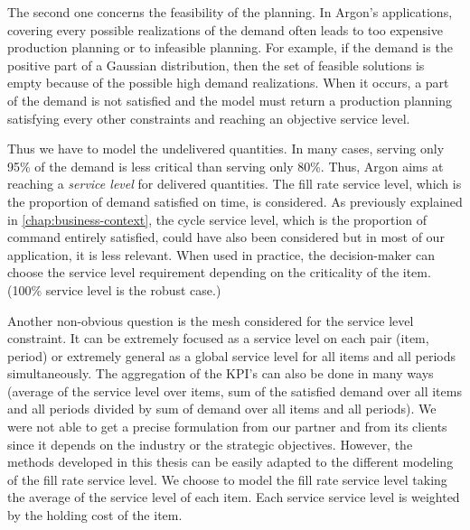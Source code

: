 The second one concerns the feasibility of the planning.
In Argon's applications, covering every possible realizations of the demand often leads to too expensive production planning or to infeasible planning.
For example, if the demand is the positive part of a Gaussian distribution, then the set of feasible solutions is empty  because of the possible high demand realizations.
When it occurs, a part of the demand is not satisfied and the model must return a production planning satisfying every other constraints and reaching an objective service level.


Thus we have to model the undelivered quantities.
In many cases, serving only 95\% of the demand is less critical than serving only 80\%.
Thus, Argon aims at reaching a \emph{service level} for delivered quantities.
The fill rate service level, which is the proportion of demand satisfied on time, is considered.
As previously explained in \cref{chap:business-context}, the cycle service level, which is the proportion of command entirely satisfied, could have also been considered but in most of our application, it is less relevant.
When used in practice, the decision-maker can choose the service level requirement depending on the criticality of the item.
(100\% service level is the robust case.)


Another non-obvious question is the mesh considered for the service level constraint.
It can be extremely focused as a service level on each pair (item, period) or extremely general as a global service level for all items and all periods simultaneously.
The aggregation of the KPI's can also be done in many ways (\eg average of the service level over items, sum of the satisfied demand over all items and all periods divided by sum of demand over all items and all periods).
We were not able to get a precise formulation from our partner and from its clients since it depends on the industry or the strategic objectives.
However, the methods developed in this thesis can be easily adapted to the different modeling of the fill rate service level.
We choose to model the fill rate service level taking the average of the service level of each item.
Each service service level is weighted by the holding cost of the item.


